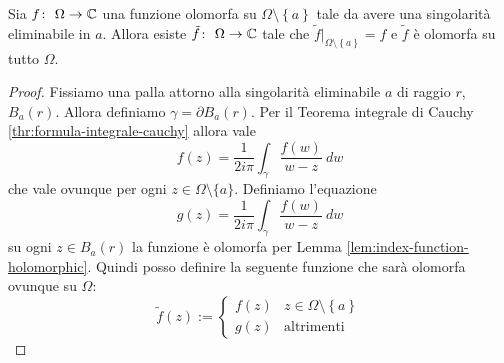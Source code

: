 \begin{theorem}
    Sia $f \colon\ \Omega \rightarrow \mathbb{C}$ una funzione olomorfa su $\Omega
    \setminus \left\{ a \right\}$ tale da avere una singolarità eliminabile
    in $a$. Allora esiste $\tilde{f} \colon\ \Omega \rightarrow \mathbb{C}$ tale che 
    $\tilde{f}|_{\Omega \setminus \left\{ a \right\}} = f$ e $\tilde{f}$ 
    è olomorfa su tutto $\Omega$.  
  \label{thr:distruzione-singolarita-semplici}
\end{theorem}
\begin{proof}
  Fissiamo una palla attorno alla singolarità eliminabile $a$ di raggio $r$,
  $B_a(r)$. Allora definiamo $\gamma = \partial B_a(r)$. Per il Teorema
  integrale di Cauchy \ref{thr:formula-integrale-cauchy} allora vale 
  \begin{equation*}
    f(z) = \frac{1}{2i\pi} \int_\gamma \frac{f(w)}{w-z}\ dw
  \end{equation*}
  che vale ovunque per ogni $z \in \Omega \setminus \{a\}$. Definiamo
  l'equazione 
  \begin{equation*}
    g(z) =  \frac{1}{2i\pi} \int_\gamma \frac{f(w)}{w-z}\ dw
  \end{equation*}
  su ogni $z \in B_a(r)$ la funzione è olomorfa per Lemma
  \ref{lem:index-function-holomorphic}. Quindi posso definire la seguente
  funzione che sarà olomorfa ovunque su $\Omega$:
  \begin{equation*}
    \tilde{f}(z) := \begin{cases}
      f(z) & z \in \Omega \setminus \left\{ a \right\} \\
      g(z) & \text{altrimenti}
    \end{cases}
  \end{equation*}
\end{proof}

